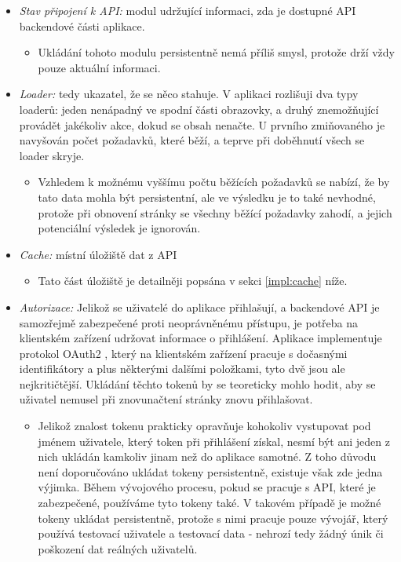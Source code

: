\begin{itemize}
    \item \emph{Stav připojení k API:} modul udržující informaci, zda je dostupné API backendové části aplikace.
        \begin{itemize}
            \item Ukládání tohoto modulu persistentně nemá příliš smysl, protože drží vždy pouze aktuální informaci.
        \end{itemize}
    \item \emph{Loader:} tedy ukazatel, že se něco stahuje. V aplikaci rozlišuji dva typy loaderů: jeden nenápadný ve spodní části obrazovky, a druhý znemožňující provádět jakékoliv akce, dokud se obsah nenačte. U prvního zmiňovaného je navyšován počet požadavků, které běží, a teprve při doběhnutí všech se loader skryje.
        \begin{itemize}
            \item Vzhledem k možnému vyššímu počtu běžících požadavků se nabízí, že by tato data mohla být persistentní, ale ve výsledku je to také nevhodné, protože při obnovení stránky se všechny běžící požadavky zahodí, a jejich potenciální výsledek je ignorován.
        \end{itemize}
    \item \emph{Cache:} místní úložiště dat z API
        \begin{itemize}
            \item Tato část úložiště je detailněji popsána v sekci \ref{impl:cache} níže.
        \end{itemize}
    \item \emph{Autorizace:} Jelikož se uživatelé do aplikace přihlašují, a backendové API je samozřejmě zabezpečené proti neoprávněnému přístupu, je potřeba na klientském zařízení udržovat informace o přihlášení. Aplikace implementuje protokol OAuth2 \cite{oauth2rfc}, který na klientském zařízení pracuje s dočasnými identifikátory  a  plus některými dalšími položkami, tyto dvě jsou ale nejkritičtější. Ukládání těchto tokenů by se teoreticky mohlo hodit, aby se uživatel nemusel při znovunačtení stránky znovu přihlašovat.
        \begin{itemize}
            \item Jelikož znalost tokenu prakticky opravňuje kohokoliv vystupovat pod jménem uživatele, který token při přihlášení získal, nesmí být ani jeden z nich ukládán kamkoliv jinam než do aplikace samotné. Z toho důvodu není doporučováno ukládat tokeny persistentně, existuje však zde jedna výjimka. Během vývojového procesu, pokud se pracuje s API, které je zabezpečené, používáme tyto tokeny také. V takovém případě je možné tokeny ukládat persistentně, protože s nimi pracuje pouze vývojář, který používá testovací uživatele a testovací data - nehrozí tedy žádný únik či poškození dat reálných uživatelů.

\end{itemize}
\end{itemize}
